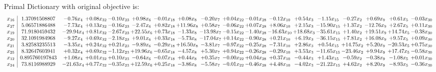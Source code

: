 \documentclass[9pt]{article}
\begin{document}
Primal Dictionary with original objective is:
\[\begin{array}{c| c c@{\hskip 2pt} c@{\hskip 2pt} c@{\hskip 2pt} c@{\hskip 2pt} c@{\hskip 2pt} c@{\hskip 2pt} c@{\hskip 2pt} c@{\hskip 2pt} c@{\hskip 2pt} c@{\hskip 2pt} c@{\hskip 2pt} c@{\hskip 2pt} c@{\hskip 2pt} c@{\hskip 2pt} c@{\hskip 2pt} c@{\hskip 2pt} }
 x_{16}   &  1.37091508807 & -0.76 x_{4} & +  0.08 x_{32} & -0.10 x_{23} & +  0.98 x_{6} & -0.01 x_{18} & +  0.08 x_{8} & -0.20 x_{7} & +  0.04 x_{22} & -0.01 x_{28} & -0.12 x_{10} & +  0.54 x_{3} & -1.15 x_{15} & -0.27 x_{2} & +  0.69 x_{9} & +  0.61 x_{5} & -0.03 x_{30}\\
 x_{27}   &  5.06571886488 & -7.73 x_{4} & +  0.13 x_{32} & -0.16 x_{23} & -2.47 x_{6} & +  0.82 x_{18} & + 11.96 x_{8} & +  0.58 x_{7} & -0.06 x_{22} & +  0.07 x_{28} & +  8.06 x_{10} & +  2.15 x_{3} & -15.90 x_{15} & +  1.37 x_{2} & -12.76 x_{9} & +  2.67 x_{5} & +  0.11 x_{30}\\
 x_{19}   &  71.9180459432 & -29.94 x_{4} & +  0.81 x_{32} & -2.67 x_{23} & + 22.55 x_{6} & +  0.73 x_{18} & -1.33 x_{8} & -13.98 x_{7} & -0.15 x_{22} & -1.40 x_{28} & -16.63 x_{10} & + 18.68 x_{3} & -35.61 x_{15} & +  1.40 x_{2} & + 19.51 x_{9} & + 14.74 x_{5} & -0.38 x_{30}\\
 x_{20}   &  32.1091984968 & -9.27 x_{4} & +  0.69 x_{32} & -2.18 x_{23} & +  9.01 x_{6} & +  0.33 x_{18} & -5.73 x_{8} & -17.04 x_{7} & +  0.14 x_{22} & -0.90 x_{28} & +  0.21 x_{10} & +  6.19 x_{3} & -36.15 x_{15} & +  7.81 x_{2} & + 16.08 x_{9} & +  9.57 x_{5} & +  0.09 x_{30}\\
 x_{21}   &  3.82583235513 & -3.35 x_{4} & +  0.24 x_{32} & +  0.21 x_{23} & -9.89 x_{6} & -0.29 x_{18} & + 16.50 x_{8} & -3.81 x_{7} & -0.97 x_{22} & -0.25 x_{28} & -7.31 x_{10} & +  2.86 x_{3} & +  0.54 x_{15} & + 14.75 x_{2} & +  5.20 x_{9} & -20.53 x_{5} & +  0.75 x_{30}\\
 x_{25}   &  8.32647603941 & +  0.32 x_{4} & +  0.69 x_{32} & -1.12 x_{23} & + 19.96 x_{6} & -0.65 x_{18} & -4.57 x_{8} & +  5.30 x_{7} & +  0.94 x_{22} & -0.26 x_{28} & -0.29 x_{10} & +  3.53 x_{3} & -11.65 x_{15} & -23.46 x_{2} & +  9.94 x_{9} & + 17.47 x_{5} & -0.58 x_{30}\\
 x_{12}   &  0.895760197843 & +  1.08 x_{4} & +  0.01 x_{32} & +  0.10 x_{23} & -0.64 x_{6} & -0.07 x_{18} & +  0.44 x_{8} & +  0.35 x_{7} & -0.00 x_{22} & +  0.04 x_{28} & +  0.37 x_{10} & -0.44 x_{3} & +  1.43 x_{15} & -0.59 x_{2} & -0.38 x_{9} & -1.08 x_{5} & +  0.01 x_{30}\\
 x_{24}   &  73.8116988929 & -21.63 x_{4} & +  0.77 x_{32} & -0.35 x_{23} & + 12.59 x_{6} & +  0.25 x_{18} & -3.86 x_{8} & -5.58 x_{7} & -0.01 x_{22} & -0.46 x_{28} & +  4.48 x_{10} & -4.02 x_{3} & -21.22 x_{15} & +  4.62 x_{2} & +  8.20 x_{9} & -8.93 x_{5} & -0.36 x_{30}\\

\end{array}\]
\end{document}
